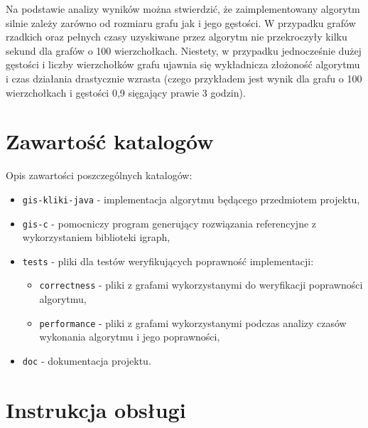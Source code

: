 \documentclass[12pt, a4paper]{article}
\begin{document}
Na podstawie analizy wyników można stwierdzić, że zaimplementowany algorytm silnie zależy 
zarówno od rozmiaru grafu jak i jego gęstości. W przypadku grafów rzadkich oraz pełnych czasy uzyskiwane przez
 algorytm nie przekroczyły kilku sekund dla grafów o 100 wierzchołkach. 
Niestety, w przypadku jednocześnie dużej gęstości i liczby wierzchołków grafu ujawnia się wykładnicza złożoność 
algorytmu i czas działania drastycznie wzrasta (czego przykładem jest wynik dla grafu o 100 wierzchołkach
i gęstości 0,9 sięgający prawie 3 godzin).
\begin{appendices}
\section{Zawartość katalogów}

Opis zawartości poszczególnych katalogów:

\begin{itemize}
 \item \texttt{gis-kliki-java} - implementacja algorytmu będącego przedmiotem projektu,
 \item \texttt{gis-c} - pomocniczy program generujący rozwiązania referencyjne z wykorzystaniem biblioteki igraph,
 \item \texttt{tests} - pliki dla testów weryfikujących poprawność implementacji:
 	\begin{itemize}
 		\item \texttt{correctness} - pliki z grafami wykorzystanymi do weryfikacji poprawności algorytmu,
 		\item \texttt{performance} - pliki z grafami wykorzystanymi podczas analizy czasów wykonania algorytmu i jego poprawności,
 	\end{itemize}
 \item \texttt{doc} - dokumentacja projektu.
\end{itemize}

\section{Instrukcja obsługi}


\end{appendices}
\end{document}
